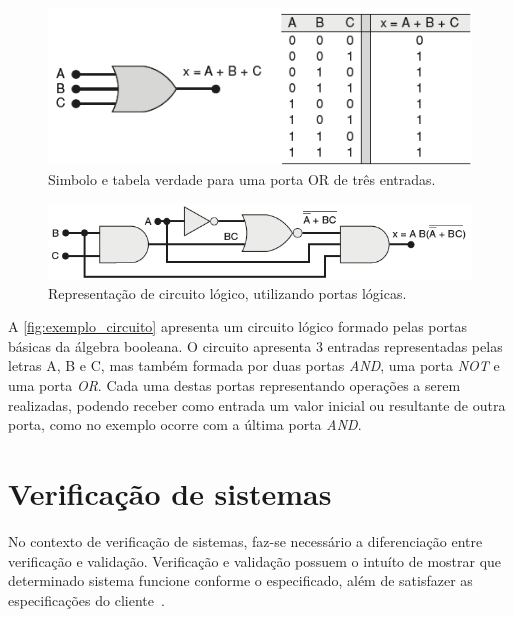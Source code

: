 \begin{figure}[H]
	\begin{center}
    \caption{\label{fig:exemplo_diagrama}Simbolo e tabela verdade para uma porta OR de três entradas.}
	\includegraphics[scale=0.60]{Figuras/exemplo_diagrama.png}
	\end{center}
\end{figure}

\begin{figure}[H]
	\begin{center}
    \caption{\label{fig:exemplo_circuito} Representação de circuito lógico, utilizando portas lógicas.}
	\includegraphics[scale=0.60]{Figuras/exemplo_circuito.png}
	\end{center}
\end{figure}

A \autoref{fig:exemplo_circuito} apresenta um circuito lógico formado pelas portas básicas da álgebra booleana. O circuito apresenta 3 entradas representadas pelas letras A, B e C, mas também formada por duas portas \textit{AND}, uma porta \textit{NOT} e uma porta \textit{OR}. Cada uma destas portas representando operações a serem realizadas, podendo receber como entrada um valor inicial ou resultante de outra porta, como no exemplo ocorre com a última porta \textit{AND}.



\section{Verificação de sistemas}
 No contexto de verificação de sistemas, faz-se necessário a diferenciação entre verificação e validação. Verificação e validação possuem o intuíto de mostrar que determinado sistema funcione conforme o especificado, além de satisfazer as especificações do cliente~\cite{sommerville2011engenharia}. 

